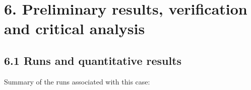 \documentclass[11pt,english]{article}
\begin{document}
\section{6. Preliminary results, verification and critical analysis}\label{preliminary-results-verification-and-critical-analysis}

\subsection{6.1 Runs and quantitative results}\label{runs-and-quantitative-results}

Summary of the runs associated with this case:

\end{document}
